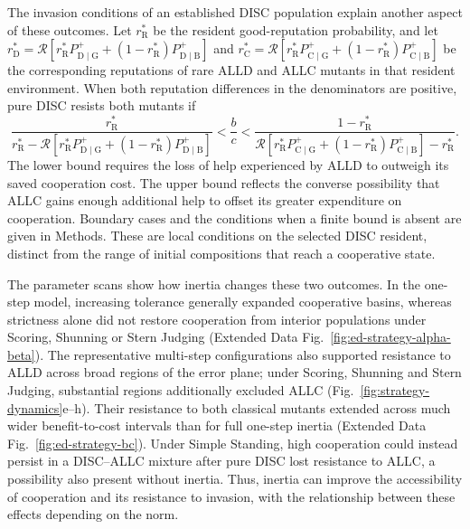 \documentclass[fleqn,10pt]{wlscirep}
\begin{document}
The invasion conditions of an established DISC population explain another aspect of these outcomes. Let $r_{\mathrm R}^{*}$ be the resident good-reputation probability, and let $r_{\mathrm D}^{*}=\mathcal R\!\left[r_{\mathrm R}^{*}P^+_{\mathrm D\mid\mathrm G}+(1-r_{\mathrm R}^{*})P^+_{\mathrm D\mid\mathrm B}\right]$ and $r_{\mathrm C}^{*}=\mathcal R\!\left[r_{\mathrm R}^{*}P^+_{\mathrm C\mid\mathrm G}+(1-r_{\mathrm R}^{*})P^+_{\mathrm C\mid\mathrm B}\right]$ be the corresponding reputations of rare ALLD and ALLC mutants in that resident environment. When both reputation differences in the denominators are positive, pure DISC resists both mutants if
\begin{equation}
\frac{r_{\mathrm R}^{*}}{r_{\mathrm R}^{*}-\mathcal R\!\left[r_{\mathrm R}^{*}P^+_{\mathrm D\mid\mathrm G}+(1-r_{\mathrm R}^{*})P^+_{\mathrm D\mid\mathrm B}\right]}
<\frac bc<
\frac{1-r_{\mathrm R}^{*}}{\mathcal R\!\left[r_{\mathrm R}^{*}P^+_{\mathrm C\mid\mathrm G}+(1-r_{\mathrm R}^{*})P^+_{\mathrm C\mid\mathrm B}\right]-r_{\mathrm R}^{*}}.
\label{eq:results-disc-viability-window}
\end{equation}
The lower bound requires the loss of help experienced by ALLD to outweigh its saved cooperation cost. The upper bound reflects the converse possibility that ALLC gains enough additional help to offset its greater expenditure on cooperation. Boundary cases and the conditions when a finite bound is absent are given in Methods. These are local conditions on the selected DISC resident, distinct from the range of initial compositions that reach a cooperative state.

The parameter scans show how inertia changes these two outcomes. In the one-step model, increasing tolerance generally expanded cooperative basins, whereas strictness alone did not restore cooperation from interior populations under Scoring, Shunning or Stern Judging (Extended Data Fig.~\ref{fig:ed-strategy-alpha-beta}). The representative multi-step configurations also supported resistance to ALLD across broad regions of the error plane; under Scoring, Shunning and Stern Judging, substantial regions additionally excluded ALLC (Fig.~\ref{fig:strategy-dynamics}e--h). Their resistance to both classical mutants extended across much wider benefit-to-cost intervals than for full one-step inertia (Extended Data Fig.~\ref{fig:ed-strategy-bc}). Under Simple Standing, high cooperation could instead persist in a DISC--ALLC mixture after pure DISC lost resistance to ALLC, a possibility also present without inertia. Thus, inertia can improve the accessibility of cooperation and its resistance to invasion, with the relationship between these effects depending on the norm.
\end{document}
